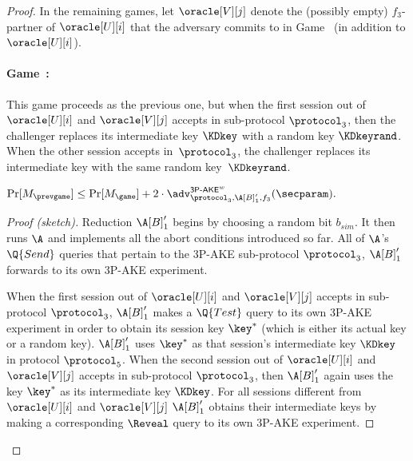 \begin{proof}
In the remaining games,
let $\oracle[V][j]$ denote the (possibly empty) $f_3$-partner of $\oracle[U][i]$ that the adversary commits to in Game~\game{}
(in addition to $\oracle[U][i]$).

\newgame
\paragraph{Game~\game:}
This game proceeds as the previous one,
but when the first session out of $\oracle[U][i]$ and $\oracle[V][j]$ accepts in sub-protocol $\protocol_3$, 
then the challenger replaces  its intermediate key $\KDkey$
with a random key $\KDkeyrand$. 
When the other session accepts in~$\protocol_3$, 
the challenger replaces its intermediate key with the same random key~$\KDkeyrand$.

\begin{lemma}\label{claim:fantastic-claim}
$
	\Pr[M_{\prevgame}]
	\leq \Pr[M_{\game}]
	+ 2 \cdot \adv_{\protocol_3,\A[B]'_1,f_3}^{\operatorname{\mathsf{3P-AKE}}^w}(\secparam)  .
$
\end{lemma}
\begin{proof}[Proof (sketch)]
Reduction $\A[B]'_1$ begins by choosing a random bit $b_{sim}$.
It then runs $\A$ and implements all the abort conditions introduced so far.
All of $\A$'s $\Q{Send}$ queries that pertain to the 3P-AKE sub-protocol $\protocol_3$,
$\A[B]'_1$ forwards to its own 3P-AKE experiment. 




When the first session out of $\oracle[U][i]$ and $\oracle[V][j]$ accepts in sub-protocol $\protocol_3$, 
$\A[B]'_1$ makes a $\Q{Test}$ query to its own 3P-AKE experiment in order to obtain its session key $\key^*$
(which is either its actual key or a random key).
$\A[B]'_1$ uses $\key^*$ as that session's intermediate key $\KDkey$ in protocol $\protocol_5$.
When the second session out of $\oracle[U][i]$ and $\oracle[V][j]$ accepts in sub-protocol $\protocol_3$, 
then $\A[B]'_1$ again uses the key $\key^*$ as its intermediate key $\KDkey$. 
For all  sessions different from $\oracle[U][i]$ and $\oracle[V][j]$ $\A[B]'_1$  obtains their intermediate keys by making a corresponding $\Reveal$ query to its own 3P-AKE experiment. 




\end{proof}
\end{proof}
